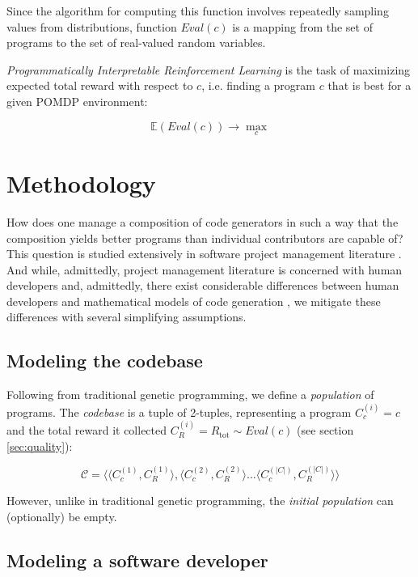 Since the algorithm for computing this function involves repeatedly sampling values from distributions, function $\mathit{Eval}(c)$ is a mapping from the set of programs to the set of real-valued random variables.

\emph{Programmatically Interpretable Reinforcement Learning} \cite{pirl} is the task of maximizing expected total reward with respect to $c$, i.e. finding a program $c$ that is best for a given POMDP environment:

\begin{equation}
    \mathbb{E}(\mathit{Eval}(c)) \longrightarrow \max_{c}
    \label{eq:pirlgoal}
\end{equation}

\newpage
\section{Methodology}

How does one manage a composition of code generators in such a way that the composition yields better programs than individual contributors are capable of? 
This question is studied extensively in software project management literature \cite{mythicalmanmonth}.
And while, admittedly, project management literature is concerned with human developers and, admittedly, there exist considerable differences between human developers and mathematical models of code generation \cite{bugfixing}, we mitigate these differences with several simplifying assumptions.

\subsection{Modeling the codebase}

Following from traditional genetic programming, we define a \emph{population} of programs. 
The \emph{codebase} is a tuple of 2-tuples, representing a program $C_c^{(i)}=c$ and the total reward it collected $C_R^{(i)}=R_\text{tot} \sim \mathit{Eval}(c)$ (see section \ref{sec:quality}):

\begin{equation}
    \mathcal{C} = \langle \langle C_c^{(1)}, C_R^{(1)} \rangle, \langle C_c^{(2)}, C_R^{(2)} \rangle \dots \langle C_c^{(|C|)}, C_R^{(|C|)} \rangle \rangle
\end{equation}

However, unlike in traditional genetic programming, the \emph{initial population} can (optionally) be empty.

\newpage \subsection{Modeling a software developer}
\label{sec:developer}

